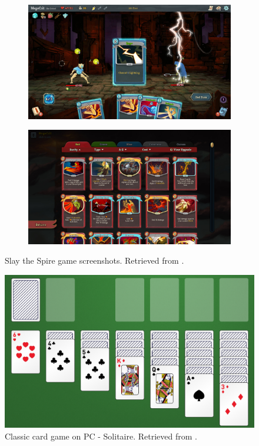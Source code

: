 \documentclass[a4paper,10pt,english]{article}
\begin{document}
\begin{figure}[h]
    \centering
    \begin{subfigure}[t]{0.45\linewidth}
        \includegraphics[width=\linewidth]{img/slay_the_spire.jpg}
        \caption{}
        \label{Fig:Style1A}
    \end{subfigure}
    \hfill
    \begin{subfigure}[t]{0.45\linewidth}
        \includegraphics[width=\linewidth]{img/slay_the_spire_2.jpg}
        \caption{}
        \label{Fig:Style1B}
    \end{subfigure}
    \caption{Slay the Spire game screenshots. Retrieved from \cite{slaythespire2024}.}
    \label{Fig:StyleComparison}
\end{figure}


\begin{figure}[h]
    \centering
    \includegraphics[width=0.5\linewidth]{img/solitaire.png}
    \caption{Classic card game on PC - Solitaire. Retrieved from \cite{goldrushsolitaire2024}.}
    \label{fig:enter-label}
\end{figure}
\end{document}
